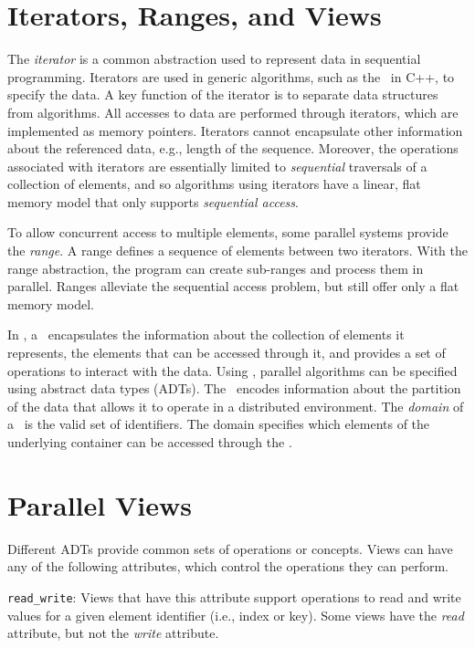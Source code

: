 \documentclass{report}
\begin{document}
\section{Iterators, Ranges, and Views}

The \emph{iterator} is a common abstraction used to represent data
in sequential programming.
Iterators are used in generic algorithms, such as
the \stl\ in C++, to specify the data.
A key function of the iterator is to separate data structures from algorithms.
All accesses to data are performed through iterators, which are implemented
as memory pointers.  Iterators cannot encapsulate other information about the
referenced data, e.g., length of the sequence.
Moreover, the operations associated with iterators are essentially
limited to {\em sequential} traversals of a collection of elements,
and so algorithms using iterators have a linear, flat memory model
that only supports {\em sequential access}.

To allow concurrent access to multiple elements,
some parallel systems provide the \emph{range}.
A range defines a sequence of elements between two
iterators. With the range abstraction, the program can create
sub-ranges and process them in parallel.  Ranges alleviate the
sequential access problem, but still offer only a flat memory model.

In \stapl, a \pview\ encapsulates the information about the collection
of elements it represents, the elements that can be accessed through it,
and provides a set of operations to interact with the data.
Using \pviews, parallel algorithms can be specified using abstract data
types (ADTs).  The \pview\ encodes information about the partition of
the data that allows it to operate in a distributed environment.
The \emph{domain} of a \pview\ is the valid set of identifiers.
The domain specifies which elements of the underlying container
can be accessed through the \pview.

\section{Parallel Views}

Different ADTs provide common sets of operations or concepts.
Views can have any of the following attributes, which control the
operations they can perform.

\texttt{read\_write}:
Views that have this attribute support operations to read and
write values for a given element identifier (i.e., index or key).
Some views have the \emph{read} attribute, but not the \emph{write}
attribute.
\end{document}
